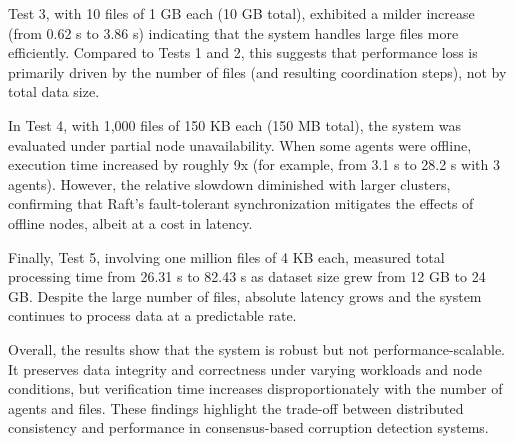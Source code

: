 Test 3, with 10 files of 1 GB each (10 GB total), exhibited a milder increase (from 0.62 s to 3.86 s) indicating that the system handles large files more efficiently. Compared to Tests 1 and 2, this suggests that performance loss is primarily driven by the number of files (and resulting coordination steps), not by total data size.

In Test 4, with 1,000 files of 150 KB each (150 MB total), the system was evaluated under partial node unavailability. When some agents were offline, execution time increased by roughly 9x (for example, from 3.1 s to 28.2 s with 3 agents). However, the relative slowdown diminished with larger clusters, confirming that Raft's fault-tolerant synchronization mitigates the effects of offline nodes, albeit at a cost in latency.

Finally, Test 5, involving one million files of 4 KB each, measured total
processing time from 26.31 s to 82.43 s as dataset size grew from 12 GB to 24
GB. Despite the large number of files, absolute latency grows and the system continues to process data at a predictable rate.

Overall, the results show that the system is robust but not performance-scalable. It preserves data integrity and correctness under varying workloads and node conditions, but verification time increases disproportionately with the number of agents and files. These findings highlight the trade-off between distributed consistency and performance in consensus-based corruption detection systems.
